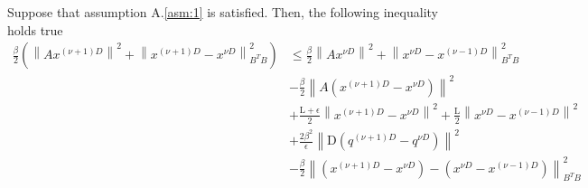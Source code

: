     \begin{lemma}\label{lem:3.3}
        Suppose that assumption A.\ref{asm:1} is satisfied. Then, the following inequality holds true
        \begin{equation}\label{eq:3.2.12}
            \begin{align}
                \frac{\beta}{2}\left(\left \lVert Ax^{(\nu + 1)D}\right \rVert^2 + \left \lVert x^{(\nu + 1)D} - x^{\nu D} \right \rVert^2_{B^TB} \right)
                &\leq \frac{\beta}{2} \left \lVert Ax^{\nu D}\right \rVert^2 + \left \lVert x^{\nu D} - x^{(\nu - 1)D} \right \rVert^2_{B^TB}\\
                &- \frac{\beta}{2}\left \lVert A\left(x^{(\nu + 1)D} - x^{\nu D}\right)\right \rVert^2 
                \\&+ \frac{\mathrm{L} + \epsilon}{2}\left \lVert x^{(\nu + 1)D} - x^{\nu D} \right \rVert^2 + \frac{\mathrm{L}}{2}\left \lVert x^{\nu D} - x^{(\nu - 1)D} \right \rVert^2 \\&+ \frac{2 \beta^2}{\epsilon}\left \lVert \mathrm{D}\left(q^{(\nu + 1)D} - q^{\nu D}\right) \right \rVert^2 \\
                &- \frac{\beta}{2}\left \lVert \left(x^{(\nu + 1)D} -x^{\nu D}\right) - \left( x^{\nu D} - x^{(\nu - 1)D} \right)  \right \rVert^2_{B^TB}
            \end{align}
        \end{equation}
    \end{lemma}
